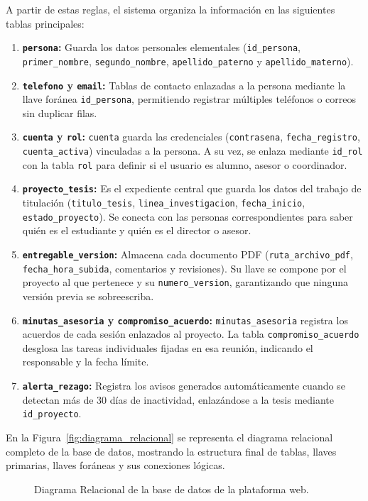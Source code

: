 A partir de estas reglas, el sistema organiza la información en las siguientes tablas principales:
\begin{enumerate}
    \item \textbf{\texttt{persona}:} Guarda los datos personales elementales (\texttt{id\_persona}, \texttt{primer\_nombre}, \texttt{segundo\_nombre}, \texttt{apellido\_paterno} y \texttt{apellido\_materno}).
    \item \textbf{\texttt{telefono} y \texttt{email}:} Tablas de contacto enlazadas a la persona mediante la llave foránea \texttt{id\_persona}, permitiendo registrar múltiples teléfonos o correos sin duplicar filas.
    \item \textbf{\texttt{cuenta} y \texttt{rol}:} \texttt{cuenta} guarda las credenciales (\texttt{contrasena}, \texttt{fecha\_registro}, \texttt{cuenta\_activa}) vinculadas a la persona. A su vez, se enlaza mediante \texttt{id\_rol} con la tabla \texttt{rol} para definir si el usuario es alumno, asesor o coordinador.
    \item \textbf{\texttt{proyecto\_tesis}:} Es el expediente central que guarda los datos del trabajo de titulación (\texttt{titulo\_tesis}, \texttt{linea\_investigacion}, \texttt{fecha\_inicio}, \texttt{estado\_proyecto}). Se conecta con las personas correspondientes para saber quién es el estudiante y quién es el director o asesor.
    \item \textbf{\texttt{entregable\_version}:} Almacena cada documento PDF (\texttt{ruta\_archivo\_pdf}, \texttt{fecha\_hora\_subida}, comentarios y revisiones). Su llave se compone por el proyecto al que pertenece y su \texttt{numero\_version}, garantizando que ninguna versión previa se sobreescriba.
    \item \textbf{\texttt{minutas\_asesoria} y \texttt{compromiso\_acuerdo}:} \texttt{minutas\_asesoria} registra los acuerdos de cada sesión enlazados al proyecto. La tabla \texttt{compromiso\_acuerdo} desglosa las tareas individuales fijadas en esa reunión, indicando el responsable y la fecha límite.
    \item \textbf{\texttt{alerta\_rezago}:} Registra los avisos generados automáticamente cuando se detectan más de 30 días de inactividad, enlazándose a la tesis mediante \texttt{id\_proyecto}.
\end{enumerate}

En la Figura~\ref{fig:diagrama_relacional} se representa el diagrama relacional completo de la base de datos, mostrando la estructura final de tablas, llaves primarias, llaves foráneas y sus conexiones lógicas.

\begin{figure}[htbp]
    \centering
    \caption{Diagrama Relacional de la base de datos de la plataforma web.}
    \label{fig:diagrama_relacional_fn3}
\end{figure}
